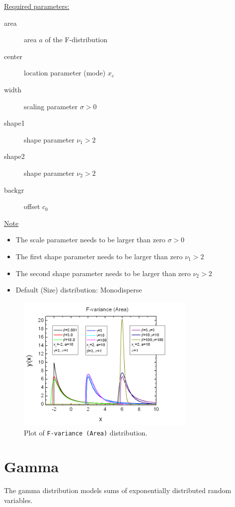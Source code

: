 \vspace{5mm}
\uline{Required parameters:}
\begin{description}
    \item[area] area $a$ of the F-distribution
    \item[center] location parameter (mode) $x_c$
    \item[width] scaling parameter $\sigma>0$
    \item[shape1] shape parameter $\nu_1>2$
    \item[shape2] shape parameter $\nu_2>2$
    \item[backgr] offset $c_0$
\end{description}

\uline{Note}
\begin{itemize}
  \item The scale parameter needs to be larger than zero $\sigma>0$
  \item The first shape parameter needs to be larger than zero $\nu_1>2$
  \item The second shape parameter needs to be larger than zero $\nu_2>2$
  \item Default (Size) distribution: Monodisperse
\end{itemize}

\begin{figure}[htb]
\begin{center}
\includegraphics[width=0.768\textwidth]{FvarianceArea.png}
\end{center}
\caption{Plot of \texttt{F-variance (Area)} distribution.}
\label{fig:FVarianceArea}
\end{figure}

\clearpage
\section{Gamma}
\label{sec:GammaDistr}
The gamma distribution models sums of exponentially distributed random variables.

